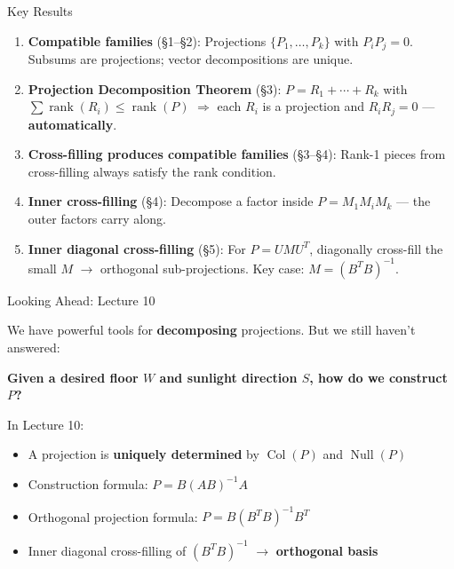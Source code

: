\documentclass[10pt]{beamer}
\theoremstyle{definition}
\newcommand{\x}[1]{\alert{\textbf{#1}}}
\begin{document}
\begin{frame}{Key Results}

\begin{enumerate}
\item \x{Compatible families} (\S1--\S2): Projections $\{P_1, \ldots, P_k\}$ with $P_iP_j = 0$. Subsums are projections; vector decompositions are unique.

\vspace{0.3em}

\item \x{Projection Decomposition Theorem} (\S3): $P = R_1 + \cdots + R_k$ with $\sum \operatorname{rank}(R_i) \leq \operatorname{rank}(P)$ $\Longrightarrow$ each $R_i$ is a projection and $R_iR_j = 0$ --- \x{automatically}.

\vspace{0.3em}

\item \x{Cross-filling produces compatible families} (\S3--\S4): Rank-1 pieces from cross-filling always satisfy the rank condition.

\vspace{0.3em}

\item \x{Inner cross-filling} (\S4): Decompose a factor inside $P = M_1 M_i M_k$ --- the outer factors carry along.

\vspace{0.3em}

\item \x{Inner diagonal cross-filling} (\S5): For $P = UMU^T$, diagonally cross-fill the small $M$ $\to$ orthogonal sub-projections. Key case: $M = (B^TB)^{-1}$.
\end{enumerate}

\end{frame}


\begin{frame}{Looking Ahead: Lecture 10}

We have powerful tools for \x{decomposing} projections. But we still haven't answered:

\vspace{0.5em}

\x{Given a desired floor $W$ and sunlight direction $S$, how do we construct $P$?}

\vspace{0.5em}

In Lecture 10:
\begin{itemize}
\item A projection is \x{uniquely determined} by $\operatorname{Col}(P)$ and $\operatorname{Null}(P)$
\item Construction formula: $P = B(AB)^{-1}A$
\item Orthogonal projection formula: $P = B(B^TB)^{-1}B^T$
\item Inner diagonal cross-filling of $(B^TB)^{-1}$ $\to$ \x{orthogonal basis}
\end{itemize}

\end{frame}
\end{document}
